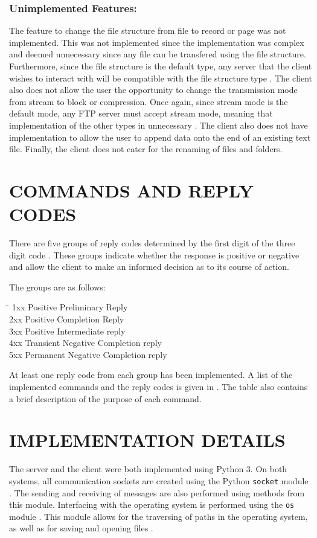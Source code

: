 \documentclass[10pt,twocolumn]{witseiepaper}
\begin{document}
\subsubsection*{Unimplemented Features:}
The feature to change the file structure from file to record or page was not implemented. This was not implemented since the implementation was complex and deemed unnecessary since any file can be transfered using the file structure. Furthermore, since the file structure is the default type, any server that the client wishes to interact with will be compatible with the file structure type \cite{rfc}. The client also does not allow the user the opportunity to change the transmission mode from stream to block or compression. Once again, since stream mode is the default mode, any FTP server must accept stream mode, meaning that implementation of the other types in unnecessary \cite{rfc}. The client also does not have implementation to allow the user to append data onto the end of an existing text file. Finally, the client does not cater for the renaming of files and folders.

\section{COMMANDS AND REPLY CODES} \label{sec:commands}
There are five groups of reply codes determined by the first digit of the three digit code \cite{rfc}. These groups indicate whether the response is positive or negative and allow the client to make an informed decision as to its course of action.

The groups are as follows:
\begin{tabbing}
	\hspace{4em}\=\kill
1xx	\> Positive Preliminary Reply \\ 
2xx	\> Positive Completion Reply\\ 
3xx	\> Positive Intermediate reply \\ 
4xx	\> Transient Negative Completion reply \\ 
5xx	\> Permanent Negative Completion reply
\end{tabbing} 

At least one reply code from each group has been implemented. A list of the implemented commands and the reply codes is given in . The table also contains a brief description of the purpose of each command.

\section{IMPLEMENTATION DETAILS}
The server and the client were both implemented using Python 3. On both systems, all communication sockets are created using the Python \texttt{socket} module \cite{socket}. The sending and receiving of messages are also performed using methods from this module. Interfacing with the operating system is performed using the \texttt{os} module \cite{os}. This module allows for the traversing of paths in the operating system, as well as for saving and opening files \cite{os}. 
\end{document}
